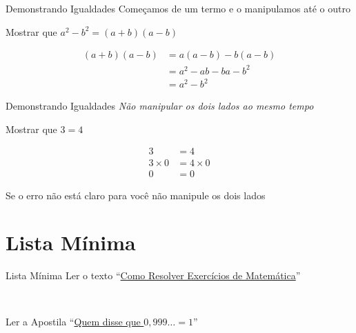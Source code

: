 \begin{frame}{Demonstrando Igualdades}
  Começamos de um termo e o manipulamos até o outro

  \pause
  \vspace{\baselineskip}
  Mostrar que \(a^2-b^2 = (a+b)(a-b)\)

  \pause
  \begin{align*}
    (a+b)(a-b)
    & = a(a-b) - b(a-b) \\
    & = a^2 - ab - ba - b^2 \\
    & = a^2 - b^2
  \end{align*}
\end{frame}

\begin{frame}{Demonstrando Igualdades}
  \emph{Não manipular os dois lados ao mesmo tempo}

  \pause
  \vspace{\baselineskip}
  Mostrar que \(3=4\)

  \pause
  \begin{align*}
    3          & = 4          \\
    3 \times 0 & = 4 \times 0 \\
    0          & = 0
  \end{align*}

  \pause
  Se o erro não está claro para você não manipule os dois lados
\end{frame}

\section{Lista Mínima}

\begin{frame}{Lista Mínima}
  Ler o texto
  ``\href{https://drive.google.com/file/d/1h39y9FEjm6QrzK2Lqjg15CQ94gvFqjtu/view?usp=sharing}%
  {Como Resolver Exercícios de Matemática}''

  ~

  Ler a Apostila
  ``\href{https://sites.google.com/view/prof-luis-dafonseca/ensino-b\%C3\%A1sico/infinito}%
  {Quem disse que $0,999\dots=1$}''
\end{frame}



